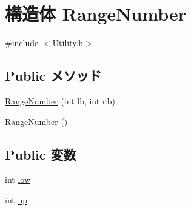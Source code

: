 \hypertarget{struct_range_number}{\section{構造体 Range\-Number}
\label{struct_range_number}
}


{\ttfamily \#include $<$Utility.\-h$>$}

\subsection*{Public メソッド}
\begin{DoxyCompactItemize}
\item 
\hyperlink{struct_range_number_ae65f83dd5c79b86a781d594e30edac17}{Range\-Number} (int lb, int ub)
\item 
\hyperlink{struct_range_number_a72c9b0f36cfb6c1b99d692daafafddf1}{Range\-Number} ()
\end{DoxyCompactItemize}
\subsection*{Public 変数}
\begin{DoxyCompactItemize}
\item 
int \hyperlink{struct_range_number_a0ba35a5ec8d4c1184344e4e90f1d7c6b}{low}
\item 
int \hyperlink{struct_range_number_afdc3b20ea90fa3c85c7a581c0cce3236}{up}
\end{DoxyCompactItemize}


